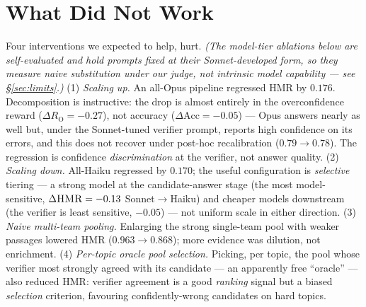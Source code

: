\documentclass[sigconf,nonacm]{acmart}
\newcommand{\HMR}{\textsc{HMR}}
\newcommand{\RO}{R_{\mathrm{O}}}
\begin{document}
\begin{table}[t]
\centering\small
\caption{Non-LLM technique sweep (self-evaluated surrogate, $n{=}65$). Confidence is
recovered cheaply; variance-based uncertainty fails; accuracy needs scale.}
\label{tab:sweep}
\end{table}

\section{What Did Not Work}
\label{sec:negative}
Four interventions we expected to help, hurt. \emph{(The model-tier ablations below are
self-evaluated and hold prompts fixed at their Sonnet-developed form, so they measure naive
substitution under our judge, not intrinsic model capability --- see \S\ref{sec:limits}.)}
(1) \emph{Scaling up.} An all-Opus pipeline regressed \HMR{} by $0.176$. Decomposition is
instructive: the drop is almost entirely in the overconfidence reward ($\Delta\RO{=}{-}0.27$),
not accuracy ($\Delta\text{Acc}{=}{-}0.05$) --- Opus answers nearly as well but, under the
Sonnet-tuned verifier prompt, reports high confidence on its errors, and this does not
recover under post-hoc recalibration ($0.79\!\to\!0.78$). The regression is confidence
\emph{discrimination} at the verifier, not answer quality.
(2) \emph{Scaling down.} All-Haiku regressed by $0.170$; the useful configuration is
\emph{selective} tiering --- a strong model at the candidate-answer stage (the most
model-sensitive, $\Delta\HMR=-0.13$ Sonnet$\to$Haiku) and cheaper models downstream (the
verifier is least sensitive, $-0.05$) --- not uniform scale in either direction.
(3) \emph{Naive multi-team pooling.} Enlarging the strong single-team pool with weaker
passages lowered \HMR{} ($0.963\!\to\!0.868$); more evidence was dilution, not enrichment.
(4) \emph{Per-topic oracle pool selection.} Picking, per topic, the pool whose verifier
most strongly agreed with its candidate --- an apparently free ``oracle'' --- also reduced
\HMR: verifier agreement is a good \emph{ranking} signal but a biased \emph{selection}
criterion, favouring confidently-wrong candidates on hard topics.
\end{document}
